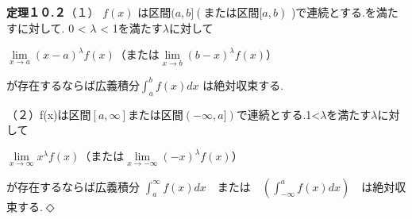 \documentclass[11pt,uplatex,a5paper]{jsarticle} %
\begin{document}
\textbf{定理１０.２}（１） $f(x)$ は区間$(a,b] (または区間[a,b)$ )で連続とする.を満たすに対して. 0 < $\lambda$ < 1を満たす$\lambda$に対して

\begin{center}

    $\lim\limits_{x \to a} (x-a)^{\lambda}f(x) （または　\lim\limits_{x \to b} (b-x)^{\lambda}f(x)）$
    
\end{center}

が存在するならば広義積分$\int_a^b f(x) dx$ は絶対収束する.

（２）f(x)は区間$[a,\infty]$または区間$(-\infty,a])$で連続とする.1<$\lambda$を満たす$\lambda$に対して

\begin{center}

    $\lim\limits_{x \to \infty} x^{\lambda}f(x) （または　\lim\limits_{x \to -\infty} (-x)^{\lambda}f(x)）$
    
\end{center}

が存在するならば広義積分 $\int_a^\infty f(x)dx$　または　$\left(\int_{-\infty}^a f(x)dx\right)$　は絶対収束する.$\Diamond$
\end{document}

